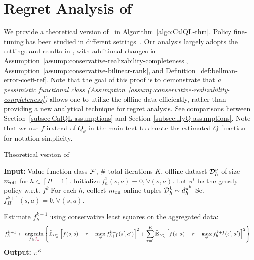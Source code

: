 \section{Regret Analysis of \methodname}
We provide a theoretical version of \methodname\ in Algorithm~\ref{algo:CalQL-thm}. Policy fine-tuning has been studied in different settings~\citep{xie2021policy,song2023hybrid,wagenmaker2022leveraging}. Our analysis largely adopts the settings and results in \citet{song2023hybrid}, with additional changes in Assumption~\ref{assump:conservative-realizability-completeness}, Assumption~\ref{assump:conservative-bilinear-rank}, and Definition~\ref{def:bellman-error-coeff-ref}. Note that the goal of this proof is to demonstrate that
{\em a pessimistic functional class (Assumption~\ref{assump:conservative-realizability-completeness})} allows one to utilize the offline data efficiently, rather than providing a new analytical technique for regret analysis. See comparisons between Section~\ref{subsec:CalQL-assumptions} and Section~\ref{subsec:HyQ-assumptions}. Note that we use $f$ instead of $Q_\theta$ in the main text to denote the estimated $Q$ function for notation simplicity.

\begin{algorithm}[H]

\caption{Theoretical version of \methodname}\label{algo:CalQL-thm}
  \begin{algorithmic}[1]
    \State \textbf{Input:} Value function class $\mathcal F$, \# total iterations $K$, offline dataset $\mathcal D_h^\nu$ of size $m_\mathrm{off}$ for $h\in[H-1]$.
    \State Initialize $f_h^1(s,a)=0,\forall (s,a)$.
    \State Let $\pi^t$ be the greedy policy w.r.t. $f^k$ 
    \State For each $h$, collect $m_\mathrm{on}$ online tuples $\mathcal D_h^k\sim d_h^{\pi^k}$ 
    \State Set $f_H^{k+1}(s,a)=0,\forall (s,a)$.

     
        \State Estimate $f_h^{k+1}$ using {\color{purple} conservative} least squares on the aggregated data: {\color{purple} }
        {\scriptsize
        \begin{equation}
            \label{eq:least-square-our-method}f_h^{k+1}\leftarrow\underset{f\in {\color{purple}\mathcal C_h}}{\arg\min}\left\{ \widehat{\mathbb E}_{\mathcal D^\nu_h}\left[ f(s,a)-r-\max_{a^\prime}f_{h+1}^{k+1}(s^\prime,a^\prime) \right]^2 + \sum_{\tau=1}^K\widehat{\mathbb E}_{\mathcal D^\tau_h}\left[ f(s,a)-r-\max_{a^\prime}f_{h+1}^{k+1}(s^\prime,a^\prime) \right]^2 \right\}  
        \end{equation}}
    \EndFor
    \EndFor
    \State \textbf{Output:} $\pi^K$
  \end{algorithmic}
\end{algorithm}


